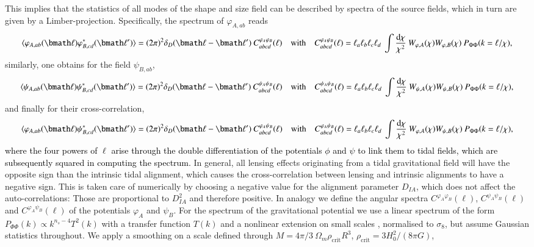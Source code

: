 \documentclass[a4paper,fleqn,usenatbib]{mnras}
\newcommand\spirou[1]{\textcolor{black}{#1}}
\newcommand{\bra}{\langle}
\newcommand{\ket}{\rangle}
\newcommand{\dd}{\mathrm{d}}
\newcommand{\dirac}{\delta_D}
\begin{document}
This implies that the statistics of all modes of the shape and size field can be described by spectra of the source fields, which in turn are given by a Limber-projection. Specifically, the spectrum of $\varphi_{A,ab}$ reads
\begin{equation}
\bra\varphi_{A,ab}(\bmath\ell)\varphi_{B,cd}^*(\bmath\ell^\prime)\ket = 
(2\pi)^2\dirac(\bmath\ell-\bmath\ell^\prime)\:C^{\varphi_A\varphi_B}_{abcd}(\ell)
\quad\mathrm{with}\quad
C^{\varphi_A\varphi_B}_{abcd}(\ell) = 
\ell_a\ell_b\ell_c\ell_d\:\int\frac{\dd\chi}{\chi^2}\:W_{\varphi,A}(\chi)W_{\varphi,B}(\chi)\:P_{\Phi\Phi}(k = \ell/\chi),
\end{equation}
similarly, one obtains for the  field $\psi_{B,ab}$,
\begin{equation}
\bra\psi_{A,ab}(\bmath\ell)\psi_{B,cd}^*(\bmath\ell^\prime)\ket = 
(2\pi)^2\dirac(\bmath\ell-\bmath\ell^\prime)\:C^{\psi_A\psi_B}_{abcd}(\ell)
\quad\mathrm{with}\quad
C^{\psi_A\psi_B}_{abcd}(\ell) = 
\ell_a\ell_b\ell_c\ell_d\:\int\frac{\dd\chi}{\chi^2}\:W_{\psi,A}(\chi)W_{\psi,B}(\chi)\:P_{\Phi\Phi}(k = \ell/\chi),
\end{equation}
and finally for their cross-correlation,
\begin{equation}
\bra\varphi_{A,ab}(\bmath\ell)\psi_{B,cd}^*(\bmath\ell^\prime)\ket =
(2\pi)^2\dirac(\bmath\ell-\bmath\ell^\prime)\:C^{\varphi_A\psi_B}_{abcd}(\ell)
\quad\mathrm{with}\quad
C^{\varphi_A\psi_B}_{abcd}(\ell) =
\ell_a\ell_b\ell_c\ell_d\:\int\frac{\dd\chi}{\chi^2}\:W_{\varphi,A}(\chi)W_{\psi,B}(\chi)\:P_{\Phi\Phi}(k = \ell/\chi),
\end{equation}
\spirou{where the four powers of $\ell$ arise through the double differentiation of the potentials $\phi$ and $\psi$ to link them to tidal fields, which are subsequently squared in computing the spectrum.} In general, all lensing effects originating from a tidal gravitational field will have the opposite sign than the intrinsic tidal alignment, which causes the cross-correlation between lensing and intrinsic alignments to have a negative sign. This is taken care of numerically by choosing a negative value for the alignment parameter $D_{IA}$, which does not affect the auto-correlations: Those are proportional to $D_{IA}^2$ and therefore positive. In analogy we define the angular spectra $C^{\varphi_A\varphi_B}(\ell)$, $C^{\psi_A\psi_B}(\ell)$ and $C^{\varphi_A\psi_B}(\ell)$ of the potentials $\varphi_A$ and  $\psi_B$. For the spectrum of the gravitational potential we use a linear spectrum of the form $P_{\Phi\Phi}(k)\propto k^{n_s-4}T^2(k)$ with a transfer function $T(k)$ and a nonlinear extension on small scales \citep{cooray_power_2001, huterer_calibrating_2005}, normalised to $\sigma_8$, but assume Gaussian statistics throughout. We apply a smoothing on a scale defined through $M = 4\pi/3\:\Omega_m\rho_\mathrm{crit}R^3$, $\rho_\mathrm{crit} = 3H_0^2/(8\pi G)$, 
\end{document}
